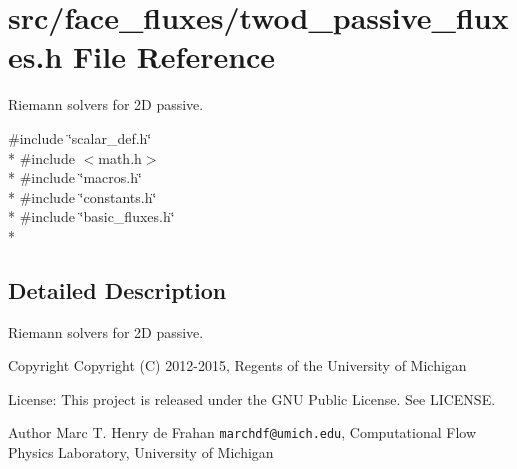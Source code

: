 \section{src/face\-\_\-fluxes/twod\-\_\-passive\-\_\-fluxes.h File Reference}
\label{twod__passive__fluxes_8h}


Riemann solvers for 2\-D passive.  


{\ttfamily \#include \char`\"{}scalar\-\_\-def.\-h\char`\"{}}\\*
{\ttfamily \#include $<$math.\-h$>$}\\*
{\ttfamily \#include \char`\"{}macros.\-h\char`\"{}}\\*
{\ttfamily \#include \char`\"{}constants.\-h\char`\"{}}\\*
{\ttfamily \#include \char`\"{}basic\-\_\-fluxes.\-h\char`\"{}}\\*


\subsection{Detailed Description}
Riemann solvers for 2\-D passive. \begin{DoxyCopyright}{Copyright}
Copyright (C) 2012-\/2015, Regents of the University of Michigan 
\end{DoxyCopyright}
\begin{DoxyParagraph}{License\-:}
This project is released under the G\-N\-U Public License. See L\-I\-C\-E\-N\-S\-E. 
\end{DoxyParagraph}
\begin{DoxyAuthor}{Author}
Marc T. Henry de Frahan {\tt marchdf@umich.\-edu}, Computational Flow Physics Laboratory, University of Michigan 
\end{DoxyAuthor}
